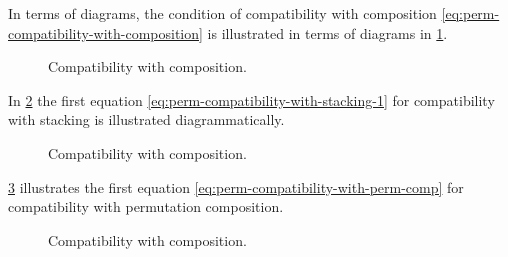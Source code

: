 
In terms of diagrams, the condition of compatibility with composition \cref{eq:perm-compatibility-with-composition} is illustrated in terms of diagrams in \cref{fig:symmetric-stacking-comp-compat}.

\begin{figure}[h]
    \centering
     \qquad \qquad
    \caption{Compatibility with composition. }
    \label{fig:symmetric-stacking-comp-compat}
\end{figure}

In \cref{fig:compatibility-with-stacking} the first equation \cref{eq:perm-compatibility-with-stacking-1} for compatibility with stacking is illustrated diagrammatically.

\begin{figure}[h]
    \centering
     \qquad \qquad
    \caption{Compatibility with composition. }
    \label{fig:compatibility-with-stacking}
\end{figure}

\cref{fig:compatibility-perm-comp} illustrates the first equation \cref{eq:perm-compatibility-with-perm-comp} for compatibility with permutation composition.

\begin{figure}[h]
    \centering
     \qquad \qquad
    \caption{Compatibility with composition. }
    \label{fig:compatibility-perm-comp}
\end{figure}

